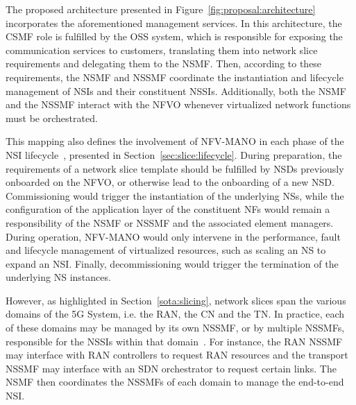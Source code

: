 The proposed architecture presented in Figure~\ref{fig:proposal:architecture} incorporates the aforementioned management services. In this architecture, the \acs{CSMF} role is fulfilled by the \acs{OSS} system, which is responsible for exposing the communication services to customers, translating them into network slice requirements and delegating them to the \acs{NSMF}. Then, according to these requirements, the \acs{NSMF} and \acs{NSSMF} coordinate the instantiation and lifecycle management of \acsp{NSI} and their constituent \acsp{NSSI}. Additionally, both the \acs{NSMF} and the \acs{NSSMF} interact with the \acs{NFVO} whenever virtualized network functions must be orchestrated.

This mapping also defines the involvement of \acs{NFV-MANO} in each phase of the \acs{NSI} lifecycle~\cite{ETSI_GR_NFV_EVE_012_V3_1_1}, presented in Section~\ref{sec:slice:lifecycle}. During preparation, the requirements of a network slice template should be fulfilled by \acsp{NSD} previously onboarded on the \acs{NFVO}, or otherwise lead to the onboarding of a new \acs{NSD}. Commissioning would trigger the instantiation of the underlying \acsp{NS}, while the configuration of the application layer of the constituent \acsp{NF} would remain a responsibility of the \acs{NSMF} or \acs{NSSMF} and the associated element managers. During operation, \acs{NFV-MANO} would only intervene in the performance, fault and lifecycle management of virtualized resources, such as scaling an \acs{NS} to expand an \acs{NSI}. Finally, decommissioning would trigger the termination of the underlying \acs{NS} instances.

However, as highlighted in Section~\ref{sota:slicing}, network slices span the various domains of the \acs{5G} System, i.e. the \acs{RAN}, the \acs{CN} and the \acs{TN}. In practice, each of these domains may be managed by its own \acs{NSSMF}, or by multiple \acsp{NSSMF}, responsible for the \acsp{NSSI} within that domain~\cite{ETSI_TS_128_533_V19_3_0}. For instance, the \acs{RAN} \acs{NSSMF} may interface with \acs{RAN} controllers to request \acs{RAN} resources and the transport \acs{NSSMF} may interface with an \acs{SDN} orchestrator to request certain links. The \acs{NSMF} then coordinates the \acsp{NSSMF} of each domain to manage the end-to-end \acs{NSI}.

